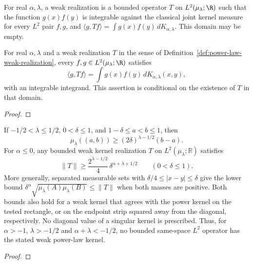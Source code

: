\begin{supporting}
\begin{definition}
\label{def:power-law-weak-realization}
\leanok
For real $\alpha,\lambda$, a weak realization is a bounded operator $T$ on
$L^2(\mu_\lambda;\R)$ such that the function $g(x)f(y)$ is integrable against the classical joint kernel measure for every $L^2$ pair $f,g$, and
$\langle g,Tf\rangle=\int g(x)f(y)\,dK_{\alpha,\lambda}$.
This domain may be empty.
\end{definition}
\begin{theorem}
\label{thm:power-law-weak-realization}
\leanok
For real $\alpha,\lambda$ and a weak realization $T$ in the sense of
Definition~\ref{def:power-law-weak-realization}, every
$f,g\in L^2(\mu_\lambda;\R)$ satisfies
\[
 \langle g,Tf\rangle=\int g(x)f(y)\,dK_{\alpha,\lambda}(x,y),
\]
with an integrable integrand. This assertion is conditional on the existence
of $T$ in that domain.
\end{theorem}
\begin{proof}
\leanok
\end{proof}

\begin{theorem}
\label{thm:power-law-endpoint-obstruction}
\leanok
If $-1/2<\lambda\le1/2$, $0<\delta\le1$, and
$1-\delta\le a<b\le1$, then
\[
 \mu_\lambda((a,b))\ge(2\delta)^{\lambda-1/2}(b-a).
\]
For $\alpha\le0$, any bounded weak kernel realization $T$ on
$L^2(\mu_\lambda;\mathbb R)$ satisfies
\[
 \|T\|\ge \frac{2^{\lambda-1/2}}4\,
 \delta^{\alpha+\lambda+1/2}\qquad(0<\delta\le1).
\]
More generally, separated measurable sets with
$\delta/4\le|x-y|\le\delta$ give the lower bound
$\delta^\alpha\sqrt{\mu_\lambda(A)\mu_\lambda(B)}\le\|T\|$
when both masses are positive. Both bounds also hold for a weak kernel
that agrees with the power kernel on the tested rectangle, or on the
endpoint strip squared away from the diagonal, respectively. No diagonal
value of a singular kernel is prescribed.
Thus, for $\alpha>-1$, $\lambda>-1/2$ and $\alpha+\lambda<-1/2$,
no bounded same-space $L^2$ operator has the stated weak power-law kernel.
\end{theorem}
\begin{proof}
\leanok
\end{proof}
\end{supporting}



